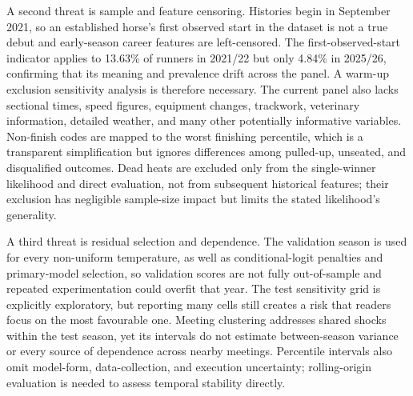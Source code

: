A second threat is sample and feature censoring. Histories begin in September 2021, so an established horse's first observed start in the dataset is not a true debut and early-season career features are left-censored. The first-observed-start indicator applies to 13.63\% of runners in 2021/22 but only 4.84\% in 2025/26, confirming that its meaning and prevalence drift across the panel. A warm-up exclusion sensitivity analysis is therefore necessary. The current panel also lacks sectional times, speed figures, equipment changes, trackwork, veterinary information, detailed weather, and many other potentially informative variables. Non-finish codes are mapped to the worst finishing percentile, which is a transparent simplification but ignores differences among pulled-up, unseated, and disqualified outcomes. Dead heats are excluded only from the single-winner likelihood and direct evaluation, not from subsequent historical features; their exclusion has negligible sample-size impact but limits the stated likelihood's generality.

A third threat is residual selection and dependence. The validation season is used for every non-uniform temperature, as well as conditional-logit penalties and primary-model selection, so validation scores are not fully out-of-sample and repeated experimentation could overfit that year. The test sensitivity grid is explicitly exploratory, but reporting many cells still creates a risk that readers focus on the most favourable one. Meeting clustering addresses shared shocks within the test season, yet its intervals do not estimate between-season variance or every source of dependence across nearby meetings. Percentile intervals also omit model-form, data-collection, and execution uncertainty; rolling-origin evaluation is needed to assess temporal stability directly.

